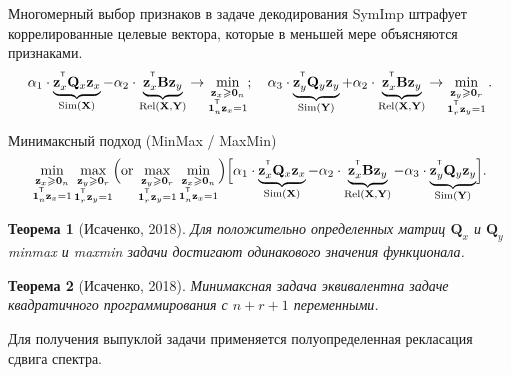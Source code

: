 \documentclass[10pt]{beamer}
\renewcommand{\geq}{\ensuremath{\geqslant}}
\newcommand{\bz}{\mathbf{z}}
\newcommand{\bB}{\mathbf{B}}
\newcommand{\bQ}{\mathbf{Q}}
\newcommand{\bX}{\mathbf{X}}
\newcommand{\bY}{\mathbf{Y}}
\newcommand{\T}{^{\text{\tiny\sffamily\upshape\mdseries T}}}
\newcommand{\bOne}{\boldsymbol{1}}
\newcommand{\bZero}{\boldsymbol{0}}
\newtheorem{rustheorem}{Теорема}
\begin{document}
\begin{frame}{Многомерный выбор признаков в задаче декодирования}
	SymImp штрафует коррелированные целевые вектора, которые в меньшей мере объясняются признаками. 
	\[
	\alpha_1 \cdot \underbrace{\bz_x^{\T} \bQ_x \bz_x}_{\text{Sim}(\bX)} - \alpha_2 \cdot \underbrace{\vphantom{()} \bz_x^{\T}\mathbf{B} \bz_y}_{\text{Rel}(\bX, \bY)} \rightarrow \min_{\substack{\bz_x \geq \bZero_n \\ \bOne_n^{\T}\bz_x=1}}; \quad
	\alpha_3 \cdot \underbrace{\bz_y^{\T} \bQ_y \bz_y}_{\text{Sim}(\bY)} + \alpha_2 \cdot \underbrace{\vphantom{()} \bz_x^{\T} \mathbf{B} \bz_y}_{\text{Rel}(\bX, \bY)} \rightarrow \min_{\substack{\bz_y \geq \bZero_r  \\ \bOne_r^{\T}\bz_y=1}}.
	\]
	\vspace{-0.2cm}
	\begin{block}{Минимаксный подход (MinMax / MaxMin)}
	\vspace{-0.5cm}
	\[
	\min_{\substack{\bz_x \geq \bZero_n \\ \bOne_n^{\T}\bz_x=1}} 	\max_{\substack{\bz_y \geq \bZero_r \\ \bOne_r^{\T}\bz_y=1}} \Bigl(\text {or} \, \max_{\substack{\bz_y \geq \bZero_r \\ \bOne_r^{\T}\bz_y=1}} \min_{\substack{\bz_x \geq \bZero_n \\ \bOne_n^{\T}\bz_x=1}}\Bigr) \Bigl[\alpha_1 \cdot \underbrace{\bz_x^{\T} \bQ_x \bz_x}_{\text{Sim}(\bX)} - \alpha_2 \cdot \underbrace{\bz_x^{\T} \bB \bz_y}_{\text{Rel}(\bX, \bY)} - \alpha_3 \cdot \underbrace{\bz_y^{\T} \bQ_y \bz_y}_{\text{Sim}(\bY)}\Bigr].
	\]
	\end{block}
	\vspace{-0.4cm}
	\begin{rustheorem}[Исаченко, 2018]
		Для положительно определенных матриц $\bQ_x$ и $\bQ_y$ minmax и maxmin задачи достигают одинакового значения функционала.
	\end{rustheorem}
	\vspace{-0.2cm}
	\begin{rustheorem}[Исаченко, 2018]
		Минимаксная задача эквивалентна задаче квадратичного программирования с $n + r + 1$ переменными.
	\end{rustheorem}
	Для получения выпуклой задачи применяется полуопределенная рекласация сдвига спектра.

\end{frame}
\end{document}
